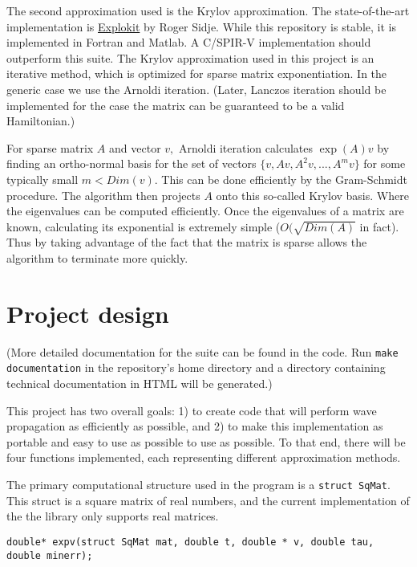 \documentclass[%
 reprint,
 amsmath,amssymb,
 aps,
]{revtex4-1}
\begin{document}
The second approximation used is the Krylov approximation. The state-of-the-art implementation is \href{http://www.maths.uq.edu.au/expokit/}{Explokit} by Roger Sidje. While this repository is stable, it is implemented in Fortran and Matlab. A C/SPIR-V implementation should outperform this suite. The Krylov approximation used in this project is an iterative method, which is optimized for sparse matrix exponentiation. In the generic case we use the Arnoldi iteration. (Later,
Lanczos iteration should be implemented for the case the matrix can be guaranteed to be a valid Hamiltonian.)

For sparse matrix $A$ and vector $v,$ Arnoldi iteration calculates $\exp(A)v$ by finding an ortho-normal basis for the set of vectors $\{v,Av,A^2v,...,A^mv\}$ for some typically small $m<Dim(v)$. This can be done efficiently by the Gram-Schmidt procedure. The algorithm then projects $A$ onto this so-called Krylov basis. Where the eigenvalues can be computed efficiently. Once the eigenvalues of a matrix are known, calculating its exponential is extremely simple ($O(\sqrt{Dim(A)}$ in fact). Thus by taking advantage of the fact that the matrix is sparse allows the algorithm to terminate more quickly.


\section{Project design}

(More detailed documentation for the suite can be found in the code. Run \texttt{make documentation} in the repository's home directory and a directory containing technical documentation in HTML will be generated.)

This project has two overall goals: 1) to create code that will perform wave propagation as efficiently as possible, and 2) to make this implementation as portable and easy to use as possible to use as possible. To that end, there will be four functions implemented, each representing different approximation methods.

The primary computational structure used in the program is a \texttt{struct SqMat}. This struct is a square matrix of real numbers, and the current implementation of the the library only supports real matrices.
\newline

\texttt{double* expv(struct SqMat mat, double t, double * v, double tau, double minerr);}
\end{document}
